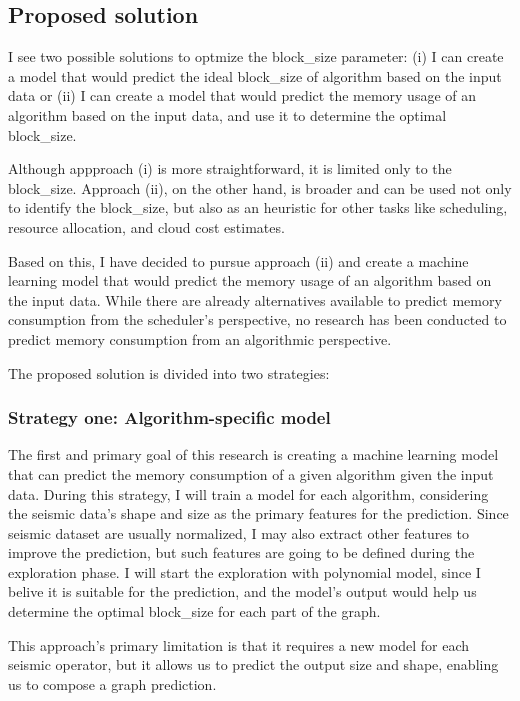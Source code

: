 \subsection{Proposed solution}
\label{subsec:proposed-solution}

I see two possible solutions to optmize the block\_size parameter:
(i) I can create a model that would predict the ideal block\_size of algorithm based on the input data or
(ii) I can create a model that would predict the memory usage of an algorithm based on the input data, and use it to determine the optimal block\_size.

Although appproach (i) is more straightforward, it is limited only to the block\_size.
Approach (ii), on the other hand, is broader and can be used not only to identify the block\_size, but also as an heuristic for other tasks like scheduling, resource allocation, and cloud cost estimates.

Based on this, I have decided to pursue approach (ii) and create a machine learning model that would predict the memory usage of an algorithm based on the input data. 
While there are already alternatives available to predict memory consumption from the scheduler's perspective, no research has been conducted to predict memory consumption from an algorithmic perspective.

The proposed solution is divided into two strategies:

\subsubsection{Strategy one: Algorithm-specific model}
\label{subsubsec:algorithm-specific-model}

The first and primary goal of this research is creating a machine learning model that can predict the memory consumption of a given algorithm given the input data.
During this strategy, I will train a model for each algorithm, considering the seismic data's shape and size as the primary features for the prediction.
Since seismic dataset are usually normalized, I may also extract other features to improve the prediction, but such features are going to be defined during the exploration phase.
I will start the exploration with polynomial model, since I belive it is suitable for the prediction, and the model's output would help us determine the optimal block\_size for each part of the graph.

This approach's primary limitation is that it requires a new model for each seismic operator, but it allows us to predict the output size and shape, enabling us to compose a graph prediction.

